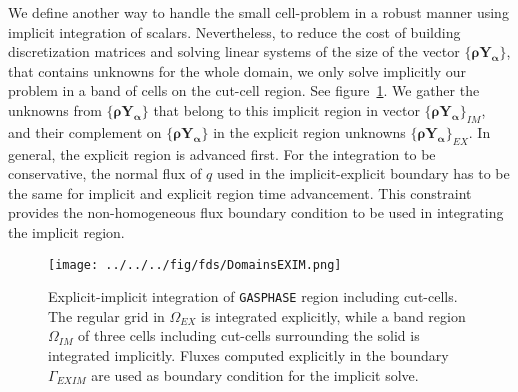 \documentclass[12pt]{article}
\begin{document}
We define another way to handle the small cell-problem in a robust manner using implicit integration of scalars. Nevertheless, to reduce the cost of building discretization matrices and solving linear systems of the size of the vector $\{\mathbf{\rho Y_\alpha}\}$, that contains unknowns for the whole domain, we only solve implicitly our problem in a band of cells on the cut-cell region. See figure~\ref{Fig:DOMEXIM}. We gather the unknowns from  $\{\mathbf{\rho Y_\alpha}\}$ that belong to this implicit region in vector $\{\mathbf{\rho Y_\alpha}\}_{IM}$, and their complement on $\{\mathbf{\rho Y_\alpha}\}$ in the explicit region unknowns $\{\mathbf{\rho Y_\alpha}\}_{EX}$. In general, the explicit region is advanced first. For the integration to be conservative, the normal flux of $q$ used in the implicit-explicit boundary has to be the same for implicit and explicit region time advancement. This constraint provides the non-homogeneous flux boundary condition to be used in integrating the implicit region. 

%
\begin{figure}[h]
      \centering
      \texttt{[image: ../../../fig/fds/DomainsEXIM.png]} 
      \caption{Explicit-implicit integration of \texttt{GASPHASE} region including cut-cells. The regular grid in $\Omega_{EX}$ is integrated explicitly, while a band region $\Omega_{IM}$ of three cells including cut-cells surrounding the solid is integrated implicitly. Fluxes computed explicitly in the boundary $\Gamma_{EXIM}$ are used as boundary condition for the implicit solve.}
	\label{Fig:DOMEXIM}
\end{figure}
%
\end{document}
